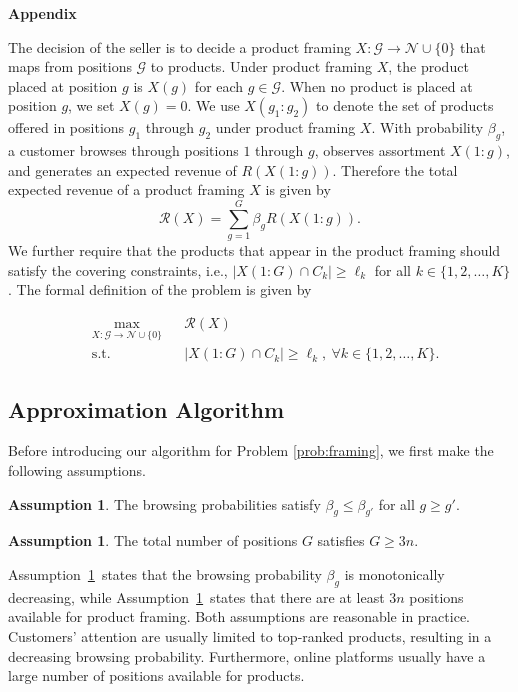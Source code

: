 \documentclass[msom,non-blindrev]{informs3} %
\theoremstyle{definition}
\newtheorem{assumption}[theorem]{Assumption}
\begin{document}
\begin{appendices}{\Large \noindent\textbf{Appendix}}
{The decision of the seller is to decide a product framing $X:\mathcal{G}\to\mathcal{N}\cup\{0\}$ that maps from positions $\mathcal{G}$ to products. Under product framing $X$, the product placed at position $g$ is $X(g)$ for each $g\in\mathcal{G}$. When no product is placed at position $g$, we set $X(g)=0$. We use $X(g_1:g_2)$ to denote the set of products offered in positions $g_1$ through $g_2$ under product framing $X$. With probability $\beta_g$, a customer browses through positions $1$ through $g$, observes assortment $X(1:g)$, and generates an expected revenue of $R(X(1:g))$. Therefore the total expected revenue of a product framing $X$ is given by 
\begin{equation*}
\mathcal{R}(X)=\sum_{g=1}^G \beta_gR(X(1:g)). 
\end{equation*}
We further require that the products that appear in the product framing should satisfy the covering constraints, i.e., $|X(1:G)\cap C_k|\geq \ell_k$ for all $k\in\{1,2,\dots,K\}$. The formal definition of the problem is given by

\begin{equation}
\label{prob:framing}
\begin{aligned}
&\max_{X:\mathcal{G}\to\mathcal{N}\cup\{0\}} && \mathcal{R}(X)\\
&\text{s.t.} && |X(1:G)\cap C_k|\geq \ell_k,\ \forall k\in\{1,2,\dots,K\}.
\end{aligned}
\end{equation}

\subsection{Approximation Algorithm}

Before introducing our algorithm for Problem \eqref{prob:framing}, we first make the following assumptions.

\begin{assumption}\label{assump:monotone_browsing_distribution}
The browsing probabilities satisfy $\beta_g\leq \beta_{g'}$ for all $g\geq g'$.
\end{assumption}

\begin{assumption}\label{assump:enough_position}
The total number of positions $G$ satisfies $G\geq 3n$.
\end{assumption}

Assumption~\ref{assump:monotone_browsing_distribution}~states that the browsing probability $\beta_g$ is monotonically decreasing, while Assumption~\ref{assump:enough_position}~states that there are at least $3n$ positions available for product framing. Both assumptions are reasonable in practice. Customers' attention are usually limited to top-ranked products, resulting in a decreasing browsing probability. Furthermore, online platforms usually have a large number of positions available for products.

}
\end{appendices}
\end{document}
